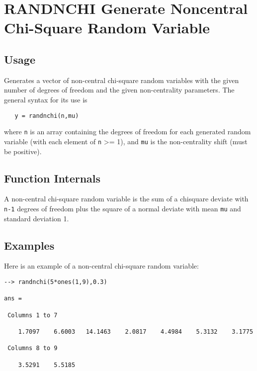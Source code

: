 \section{RANDNCHI Generate Noncentral Chi-Square Random Variable}

\subsection{Usage}

Generates a vector of non-central chi-square random variables
with the given number of degrees of freedom and the given
non-centrality parameters.  The general syntax for its use is
\begin{verbatim}
   y = randnchi(n,mu)
\end{verbatim}
where \verb|n| is an array containing the degrees of freedom for
each generated random variable (with each element of \verb|n| >= 1),
and \verb|mu| is the non-centrality shift (must be positive).
\subsection{Function Internals}

A non-central chi-square random variable is the sum of a chisquare
deviate with \verb|n-1| degrees of freedom plus the square of a normal
deviate with mean \verb|mu| and standard deviation 1.
\subsection{Examples}

Here is an example of a non-central chi-square random variable:
\begin{verbatim}
--> randnchi(5*ones(1,9),0.3)

ans = 

 Columns 1 to 7

    1.7097    6.6003   14.1463    2.0817    4.4984    5.3132    3.1775 

 Columns 8 to 9

    3.5291    5.5185 
\end{verbatim}
